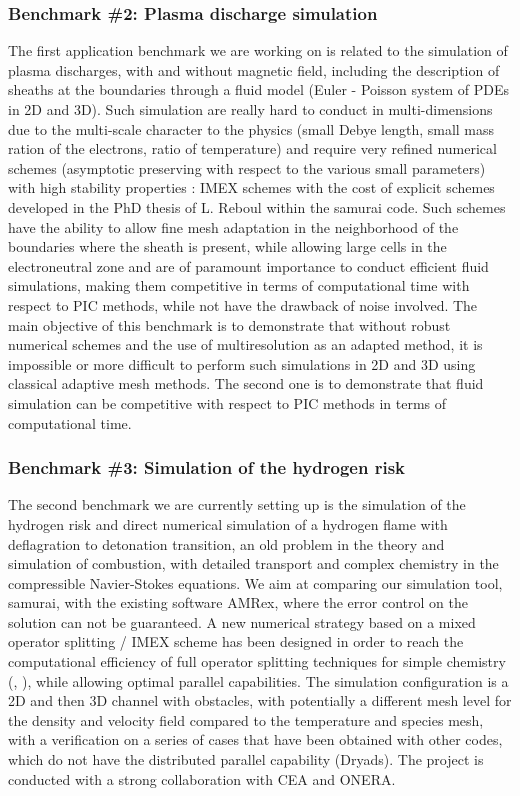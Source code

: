 \subsubsection{Benchmark \#2: Plasma discharge simulation}

The first application benchmark we are working on is related to the simulation of plasma discharges, with and without magnetic field, including the description of sheaths at the boundaries through a fluid model (Euler - Poisson system of PDEs in 2D and 3D). Such simulation are really hard to conduct in multi-dimensions due to the multi-scale character to the physics (small Debye length, small mass ration of the electrons, ratio of temperature) and require very refined numerical schemes (asymptotic preserving with respect to the various small parameters) with high stability properties : IMEX schemes with the cost of explicit schemes developed in the PhD thesis of L. Reboul within the samurai code. Such schemes have the ability to allow fine mesh adaptation in the neighborhood of the boundaries where the sheath is present, while allowing large cells in the electroneutral zone and are of paramount importance to conduct efficient fluid simulations, making them competitive in terms of computational time with respect to PIC methods, while not have the drawback of noise involved. The main objective of this benchmark is to demonstrate that without robust numerical schemes and the use of multiresolution as an adapted method, it is impossible or more difficult to perform such simulations in 2D and 3D using classical adaptive mesh methods. The second one is to demonstrate that fluid simulation can be competitive with respect to PIC methods in terms of computational time.

\subsubsection{Benchmark \#3: Simulation of the hydrogen risk}

The second benchmark we are currently setting up is the simulation of the hydrogen risk and direct numerical simulation of a hydrogen flame with deflagration to detonation transition, an old problem in the theory and simulation of combustion, with detailed transport and complex chemistry in the compressible Navier-Stokes equations. We aim at comparing our simulation tool, samurai, with the existing software AMRex, where the error control on the solution can not be guaranteed. A new numerical strategy based on a mixed operator splitting / IMEX scheme has been designed in order to reach the computational efficiency of full operator splitting techniques for simple chemistry (\cite{duarte_adaptive_nodate}, \cite{lecointre_hydrogen_nodate}), while allowing optimal parallel capabilities. The simulation configuration is a 2D and then 3D channel with obstacles, with potentially a different mesh level for the density and velocity field compared to the temperature and species mesh, with a verification on a series of cases that have been obtained with other codes, which do not have the distributed parallel capability (Dryads). The project is conducted with a strong collaboration with CEA and ONERA.

